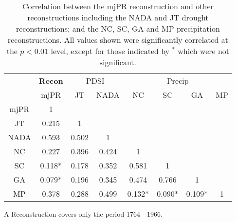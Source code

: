 

\begin{table}
  \begin{center}
    \begin{threeparttable}[b]
      \begin{tabular}{cccccccc}
\toprule
 & \textbf{Recon} & \multicolumn{2}{c}{PDSI} & \multicolumn{4}{c}{Precip} \\ \cmidrule(lr){2-2} \cmidrule(lr){3-4} \cmidrule(lr){5-8}
      & mjPR & JT & NADA & NC & SC & GA & MP\tnote{A} \\  \midrule
mjPR  &  1      & & & & & & \\
JT    &  0.215  & 1     &       &        &        &        &   \\ 
NADA  &  0.593  & 0.502 & 1     &        &        &        &   \\ 
NC    &  0.227  & 0.396 & 0.424 & 1      &        &        &   \\ 
SC    &  0.118* & 0.178 & 0.352 & 0.581  &  1     &        &   \\ 
GA    &  0.079* & 0.196 & 0.345 & 0.474  & 0.766  & 1      &   \\ 
MP    &  0.378  & 0.288 & 0.499 & 0.132* & 0.090* & 0.109* & 1 \\ \bottomrule
      \end{tabular}
      \caption{Correlation between the mjPR reconstruction and other reconstructions including the NADA and JT drought reconstructions; and the NC, SC, GA and MP precipitation reconstructions. All values shown were significantly correlated at the $p<0.01$ level, except for those indicated by $^*$ which were not significant.}
      \begin{tablenotes}
      \item [A] Reconstruction covers only the period 1764 - 1966.
      \end{tablenotes}
  \label{table:reconComps}
    \end{threeparttable}
  \end{center}
  \vspace{2cm}
\end{table}

